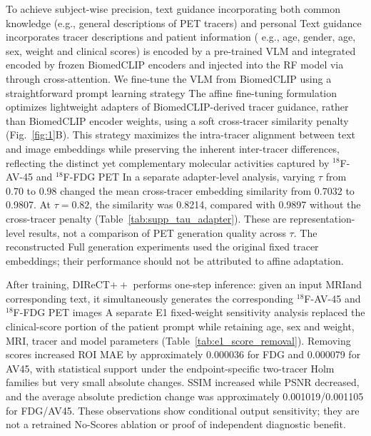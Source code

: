 \documentclass{article}
\providecommand{\DIFaddtex}[1]{{\protect\color{blue} \sf #1}} %
\providecommand{\DIFdeltex}[1]{{\protect\color{red} \scriptsize #1}} %
\providecommand{\DIFaddbegin}{} %
\providecommand{\DIFaddend}{} %
\providecommand{\DIFdelbegin}{} %
\providecommand{\DIFdelend}{} %
\providecommand{\DIFadd}[1]{\texorpdfstring{\DIFaddtex{#1}}{#1}} %
\providecommand{\DIFdel}[1]{\texorpdfstring{\DIFdeltex{#1}}{}} %
\newcommand{\DIFscaledelfig}{0.5}
\newlength{\DIFdelgraphicswidth} %
\newlength{\DIFdelgraphicsheight} %
\newcommand{\DIFaddincludegraphics}[2][]{{\color{blue}\fbox{\DIFOincludegraphics[#1]{#2}}}} %
\newcommand{\DIFdelincludegraphics}[2][]{%
\sbox{\DIFdelgraphicsbox}{\DIFOincludegraphics[#1]{#2}}%
\settoboxwidth{\DIFdelgraphicswidth}{\DIFdelgraphicsbox} %
\settoboxtotalheight{\DIFdelgraphicsheight}{\DIFdelgraphicsbox} %
\scalebox{\DIFscaledelfig}{%
\parbox[b]{\DIFdelgraphicswidth}{\usebox{\DIFdelgraphicsbox}\\[-\baselineskip] \rule{\DIFdelgraphicswidth}{0em}}\llap{\resizebox{\DIFdelgraphicswidth}{\DIFdelgraphicsheight}{%
\setlength{\unitlength}{\DIFdelgraphicswidth}%
\begin{picture}(1,1)%
\thicklines\linethickness{2pt} %
{\color[rgb]{1,0,0}\put(0,0){\framebox(1,1){}}}%
{\color[rgb]{1,0,0}\put(0,0){\line( 1,1){1}}}%
{\color[rgb]{1,0,0}\put(0,1){\line(1,-1){1}}}%
\end{picture}%
}\hspace*{3pt}}} %
} %
\DeclareRobustCommand{\DIFaddbegin}{\DIFOaddbegin \let\includegraphics\DIFaddincludegraphics} %
\DeclareRobustCommand{\DIFaddend}{\DIFOaddend \let\includegraphics\DIFOincludegraphics} %
\DeclareRobustCommand{\DIFdelbegin}{\DIFOdelbegin \let\includegraphics\DIFdelincludegraphics} %
\DeclareRobustCommand{\DIFdelend}{\DIFOaddend \let\includegraphics\DIFOincludegraphics} %
\begin{document}
\DIFdelbegin \DIFdel{To achieve subject-wise precision, text guidance incorporating both common knowledge (e.g., general descriptions of PET tracers) and personal }\DIFdelend \DIFaddbegin \DIFadd{Text guidance incorporates tracer descriptions and }\DIFaddend patient information (\DIFdelbegin \DIFdel{e.g., age, gender, }\DIFdelend \DIFaddbegin \DIFadd{age, sex, weight and }\DIFaddend clinical scores) \DIFdelbegin \DIFdel{is encoded by a pre-trained VLM and integrated }\DIFdelend \DIFaddbegin \DIFadd{encoded by frozen BiomedCLIP encoders and injected }\DIFaddend into the RF model \DIFdelbegin \DIFdel{via }\DIFdelend \DIFaddbegin \DIFadd{through }\DIFaddend cross-attention. \DIFdelbegin \DIFdel{We fine-tune the VLM from BiomedCLIP using a straightforward prompt learning strategy }\DIFdelend \DIFaddbegin \DIFadd{The affine fine-tuning formulation optimizes lightweight adapters of BiomedCLIP-derived tracer guidance, rather than BiomedCLIP encoder weights, using a soft cross-tracer similarity penalty }\DIFaddend (Fig.~\ref{fig:1}B). \DIFdelbegin \DIFdel{This strategy maximizes the intra-tracer alignment between text and image embeddings while preserving the inherent inter-tracer differences, reflecting the distinct yet complementary molecular activities captured by $^{18}$F-AV-45 and $^{18}$F-FDG PET }\DIFdelend \DIFaddbegin \DIFadd{In a separate adapter-level analysis, varying $\tau$ from 0.70 to 0.98 changed the mean cross-tracer embedding similarity from 0.7032 to 0.9807. At $\tau=0.82$, the similarity was 0.8214, compared with 0.9897 without the cross-tracer penalty (Table~\ref{tab:supp_tau_adapter}). These are representation-level results, not a comparison of PET generation quality across $\tau$. The reconstructed Full generation experiments used the original fixed tracer embeddings; their performance should not be attributed to affine adaptation}\DIFaddend .

\DIFdelbegin \DIFdel{After training, DIReCT$++$ performs one-step inference: given an input MRIand corresponding text, it simultaneously generates the corresponding $^{18}$F-AV-45 and $^{18}$F-FDG PET images }\DIFdelend \DIFaddbegin \DIFadd{A separate E1 fixed-weight sensitivity analysis replaced the clinical-score portion of the patient prompt while retaining age, sex and weight, MRI, tracer and model parameters (Table~\ref{tab:e1_score_removal}). Removing scores increased ROI MAE by approximately 0.000036 for FDG and 0.000079 for AV45, with statistical support under the endpoint-specific two-tracer Holm families but very small absolute changes. SSIM increased while PSNR decreased, and the average absolute prediction change was approximately 0.001019/0.001105 for FDG/AV45. These observations show conditional output sensitivity; they are not a retrained No-Scores ablation or proof of independent diagnostic benefit.
}
\end{document}
